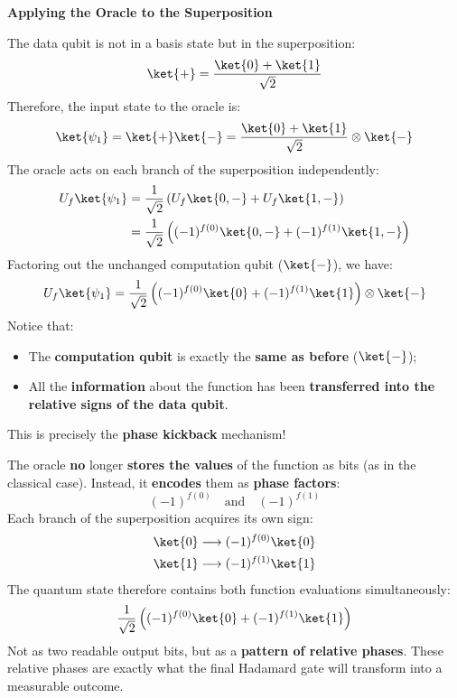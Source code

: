 \highspace
\begin{flushleft}
    \textcolor{Green3}{ \textbf{Applying the Oracle to the Superposition}}
    \label{sec:deutsch-applying-the-oracle-to-the-superposition}
\end{flushleft}
The data qubit is not in a basis state but in the superposition:
\begin{equation*}
    \ket{+} = \frac{\ket{0} + \ket{1}}{\sqrt{2}}
\end{equation*}
Therefore, the input state to the oracle is:
\begin{equation*}
    \ket{\psi_1} = \ket{+}\ket{-} = \frac{\ket{0} + \ket{1}}{\sqrt{2}} \otimes \ket{-}
\end{equation*}
The oracle acts on each branch of the superposition independently:
\begin{align*}
    U_f \ket{\psi_1} &= \frac{1}{\sqrt{2}} \left( U_f \ket{0, -} + U_f \ket{1, -} \right) \\
    &= \frac{1}{\sqrt{2}} \left( (-1)^{f(0)} \ket{0, -} + (-1)^{f(1)} \ket{1, -} \right)
\end{align*}
Factoring out the unchanged computation qubit ($\ket{-}$), we have:
\begin{equation}
    U_f \ket{\psi_1} = \frac{1}{\sqrt{2}} \left( (-1)^{f(0)} \ket{0} + (-1)^{f(1)} \ket{1} \right) \otimes \ket{-}
\end{equation}
Notice that:
\begin{itemize}
    \item The \textbf{computation qubit} is exactly the \textbf{same as before} ($\ket{-}$);
    \item All the \textbf{information} about the function has been \textbf{transferred into the relative signs of the data qubit}.
\end{itemize}
This is precisely the \textbf{phase kickback} mechanism!

\highspace
The oracle \textbf{no} longer \textbf{stores the values} of the function as bits (as in the classical case). Instead, it \textbf{encodes} them as \textbf{phase factors}:
\begin{equation*}
    \left(-1\right)^{f(0)} \quad \text{and} \quad \left(-1\right)^{f(1)}
\end{equation*}
Each branch of the superposition acquires its own sign:
\begin{equation*}
    \begin{aligned}
        \ket{0} &\longrightarrow (-1)^{f(0)} \ket{0} \\
        \ket{1} &\longrightarrow (-1)^{f(1)} \ket{1}
    \end{aligned}
\end{equation*}
The quantum state therefore contains both function evaluations simultaneously:
\begin{equation*}
    \frac{1}{\sqrt{2}} \left( (-1)^{f(0)} \ket{0} + (-1)^{f(1)} \ket{1} \right)
\end{equation*}
Not as two readable output bits, but as a \textbf{pattern of relative phases}. These relative phases are exactly what the final Hadamard gate will transform into a measurable outcome.

